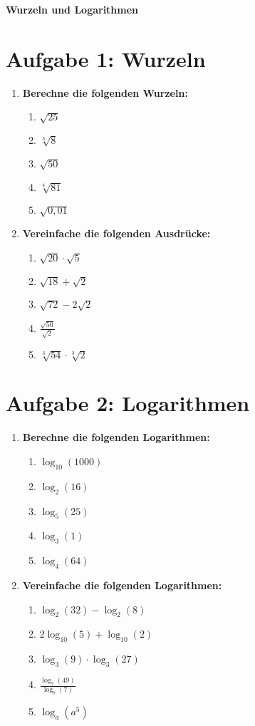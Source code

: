 \begin{center}
    \textbf{Wurzeln und Logarithmen}
\end{center}

\section*{\small Aufgabe 1: Wurzeln}
\begin{enumerate}
    \item \textbf{Berechne die folgenden Wurzeln:}
    \begin{enumerate}
        \item \(\sqrt{25}\)
        \item \(\sqrt[3]{8}\)
        \item \(\sqrt{50}\)
        \item \(\sqrt[4]{81}\)
        \item \(\sqrt{0{,}01}\)
    \end{enumerate}
    
    \item \textbf{Vereinfache die folgenden Ausdrücke:}
    \begin{enumerate}
        \item \(\sqrt{20} \cdot \sqrt{5}\)
        \item \(\sqrt{18} + \sqrt{2}\)
        \item \(\sqrt{72} - 2\sqrt{2}\)
        \item \(\frac{\sqrt{50}}{\sqrt{2}}\)
        \item \(\sqrt[3]{54} \cdot \sqrt[3]{2}\)
    \end{enumerate}
\end{enumerate}

\section*{\small Aufgabe 2: Logarithmen}
\begin{enumerate}
    \item \textbf{Berechne die folgenden Logarithmen:}
    \begin{enumerate}
        \item \(\log_{10}(1000)\)
        \item \(\log_{2}(16)\)
        \item \(\log_{5}(25)\)
        \item \(\log_{3}(1)\)
        \item \(\log_{4}(64)\)
    \end{enumerate}
    
    \item \textbf{Vereinfache die folgenden Logarithmen:}
    \begin{enumerate}
        \item \(\log_{2}(32) - \log_{2}(8)\)
        \item \(2\log_{10}(5) + \log_{10}(2)\)
        \item \(\log_{3}(9) \cdot \log_{3}(27)\)
        \item \(\frac{\log_{7}(49)}{\log_{7}(7)}\)
        \item \(\log_{a}(a^5)\)
    \end{enumerate}
\end{enumerate}

